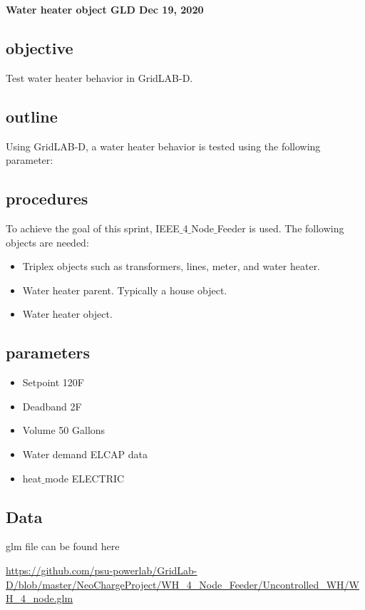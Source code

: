 \textbf{Water heater object GLD Dec 19, 2020}
\subsection{objective}

    
    Test water heater behavior in GridLAB-D.
    
\subsection{outline}
    
    Using GridLAB-D, a water heater behavior is tested using the following parameter:
\subsection{procedures}
    
    To achieve the goal of this sprint, IEEE$\_$4$\_$Node$\_$Feeder is used. The following objects are needed:
    \begin{itemize}
        \item Triplex objects such as transformers, lines, meter, and water heater.
        \item Water heater parent. Typically a house object.
        \item Water heater object.
    \end{itemize}
    
\subsection{parameters}
    
    \begin{itemize}
        \item Setpoint 120F
        \item Deadband 2F
        \item Volume 50 Gallons
        \item Water demand ELCAP data
        \item heat$\_$mode ELECTRIC
    \end{itemize}
    
\subsection{Data}
    glm file can be found here \par  \url{https://github.com/psu-powerlab/GridLab-D/blob/master/NeoChargeProject/WH_4_Node_Feeder/Uncontrolled_WH/WH_4_node.glm}

